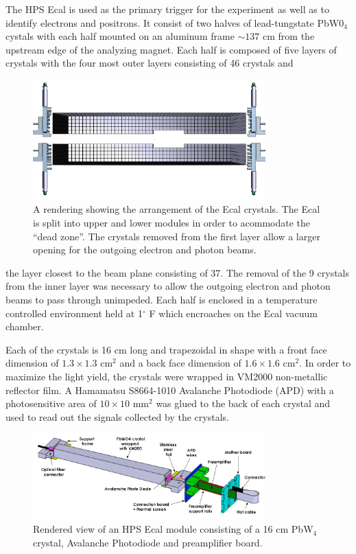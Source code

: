 The HPS Ecal is used as the primary trigger for the experiment as well as to
identify electrons and positrons.  It consist of two halves of lead-tungstate 
PbW0$_4$ cystals with each half mounted on an aluminum frame $\sim 137$ cm 
from the upstream edge of the analyzing magnet.  Each half is composed of five
layers of crystals with the four most outer layers consisting of 46 crystals and 
\begin{figure}
    \centering
    \includegraphics[width=0.8\textwidth]{images/ecal_layout.png}
    \caption{A rendering showing the arrangement of the Ecal crystals.  The Ecal
             is split into upper and lower modules in order to acommodate the 
             ``dead zone''.  The crystals removed from the first layer allow
             a larger opening for the outgoing electron and photon beams.}
    \label{fig:ecal_layout}
\end{figure}
the layer closest to the beam plane consisting of 37. The removal of the 9 
crystals from the inner layer was necessary to allow the outgoing electron and
photon beams to pass through unimpeded.  Each half is enclosed in a temperature
controlled environment held at 1$^{\circ}$ F which encroaches on the Ecal 
vacuum chamber.

Each of the crystals is 16 cm long and trapezoidal in shape with a front face
dimension of $1.3 \times 1.3$ cm$^2$ and a back face dimension of $1.6 \times
1.6$ cm$^2$.  In order to maximize the light yield, the crystals were wrapped
in VM2000 non-metallic reflector film. A Hamamatsu S8664-1010 Avalanche 
Photodiode (APD) with a photosensitive area of $10 \times 10$ mm$^2$ was glued
to the back of each crystal and used to read out the signals collected by the
crystals.  
\begin{figure}
    \centering
    \includegraphics[width=0.8\textwidth]{images/ecal_crystal.png}
    \caption{Rendered view of an HPS Ecal module consisting of a 16 cm PbW$_4$
             crystal, Avalanche Photodiode and preamplifier board.}
    \label{fig:ecal_crystal}
\end{figure}

